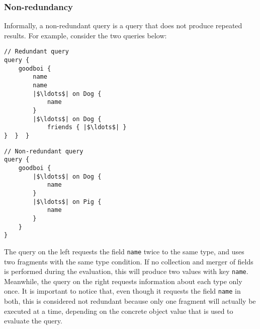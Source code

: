 
\subsubsection*{Non-redundancy}

Informally, 
a non-redundant query is a query that does not produce repeated results.
For example, consider the two queries below:

\begin{minipage}[t]{.25\textwidth}
\begin{verbatim}
// Redundant query
query {
    goodboi {
        name
        name
        |$\ldots$| on Dog {
            name
        }
        |$\ldots$| on Dog {
            friends { |$\ldots$| }
}  }  }
\end{verbatim}
\end{minipage}%
\begin{minipage}[t]{.25\textwidth}
\begin{verbatim}
// Non-redundant query
query {
    goodboi {
        |$\ldots$| on Dog {
            name
        }
        |$\ldots$| on Pig {
            name
        }
    } 
}
\end{verbatim} 
\end{minipage}

The query on the left requests the field \texttt{name} twice to the same type, and uses two fragments with the same type condition. If no collection and merger of fields is performed during the evaluation, this will produce two values with key \texttt{name}. Meanwhile, the query on the right requests information about each type only once. It is important to notice that, even though it requests the field \texttt{name} in both, this is considered not redundant because only one fragment will actually be executed at a time, 
depending on the concrete object value that is used to evaluate the query.


